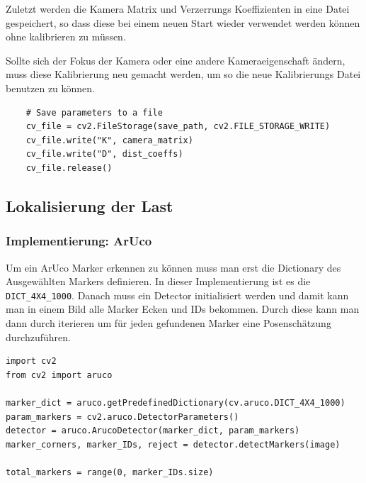Zuletzt werden die Kamera Matrix und Verzerrungs Koeffizienten in eine Datei gespeichert, so dass 
diese bei einem neuen Start wieder verwendet werden können ohne kalibrieren zu müssen.

Sollte sich der Fokus der Kamera oder eine andere Kameraeigenschaft ändern,
muss diese Kalibrierung neu gemacht werden, um so die neue Kalibrierungs Datei benutzen zu können.


\begin{lstlisting}
    # Save parameters to a file
    cv_file = cv2.FileStorage(save_path, cv2.FILE_STORAGE_WRITE)
    cv_file.write("K", camera_matrix)
    cv_file.write("D", dist_coeffs)
    cv_file.release()
\end{lstlisting}

\clearpage

\subsection{Lokalisierung der Last}

\subsubsection{Implementierung: ArUco}

Um ein ArUco Marker erkennen zu können muss man erst die Dictionary des Ausgewählten Markers definieren. 
In dieser Implementierung ist es die \texttt{DICT\_4X4\_1000}.
Danach muss ein Detector initialisiert werden und damit kann man in einem Bild alle Marker Ecken und IDs bekommen.
Durch diese kann man dann durch iterieren um für jeden gefundenen Marker eine Posenschätzung durchzuführen.



\begin{lstlisting}
import cv2
from cv2 import aruco

marker_dict = aruco.getPredefinedDictionary(cv.aruco.DICT_4X4_1000)
param_markers = cv2.aruco.DetectorParameters()
detector = aruco.ArucoDetector(marker_dict, param_markers)
marker_corners, marker_IDs, reject = detector.detectMarkers(image)

total_markers = range(0, marker_IDs.size)
\end{lstlisting}


